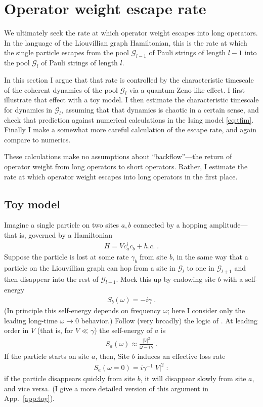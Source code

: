 \documentclass[aps,prb,nofootinbib,twocolumn,balancelastpage,amsmath,amssymb,floatfix,superscriptaddress,]{revtex4-1}
\newcommand{\pool}{\mathcal G}
\begin{document}
\section{Operator weight escape rate} \label{s:rate-loss}

We ultimately seek the rate at which operator weight escapes into long operators.
In the language of the Liouvillian graph Hamiltonian,
this is the rate at which the single particle escapes from the pool $\pool_{l-1}$ of Pauli strings of length $l-1$ into the pool $\pool_l$ of Pauli strings of length $l$.

In this section I argue that that rate is controlled by
the characteristic timescale of the coherent dynamics of the pool $\pool_l$
via a quantum-Zeno-like effect.
I first illustrate that effect with a toy model.
I then estimate the characteristic timescale for dynamics in $\pool_l$,
assuming that that dynamics is chaotic in a certain sense,
and check that prediction against numerical calculations in the Ising model \eqref{eq:tfim}.
Finally I make a somewhat more careful calculation of the escape rate,
and again compare to numerics.

These calculations make no assumptions about ``backflow''---the return of operator weight from long operators to short operators.
Rather, I estimate the rate at which operator weight escapes into long operators in the first place.


\subsection{Toy model}\label{ss:loss-toy}

Imagine a single particle on two sites $a,b$ connected by a hopping amplitude---that is, governed by a Hamiltonian
\begin{align} 
  H =  V c^\dagger_a c_b + h.c.\;.
\end{align}
Suppose the particle is lost at some rate $\gamma_b$ from site $b$,
in the same way that a particle on the Liouvillian graph can hop from a site in $\pool_l$ to one in $\pool_{l+1}$ and then disappear into the rest of $\pool_{l+1}$.
Mock this up by endowing site $b$ with a self-energy
\begin{align}
  S_b(\omega) = -i\gamma\;.
\end{align}
(In principle this self-energy depends on frequency $\omega$;
here I consider only the leading long-time $\omega \to 0$ behavior.)
Follow (very broadly) the logic of .
At leading order in $V$ (that is, for $V \ll \gamma$) the self-energy of $a$ is
\begin{align}
  S_a(\omega) \approx \frac {|V|^2}{\omega - i\gamma} \;.
\end{align}
If the particle starts on site $a$, then,
Site $b$ induces an effective loss rate
\begin{align}
  \label{eq:toy-loss-rate}
  S_a(\omega = 0) = i\gamma^{-1}|V|^2\;:
\end{align}
if the particle disappears quickly from site $b$, it will disappear slowly from site $a$, and vice versa.
(I give a more detailed version of this argument in App.~\ref{app:toy}).
\end{document}
